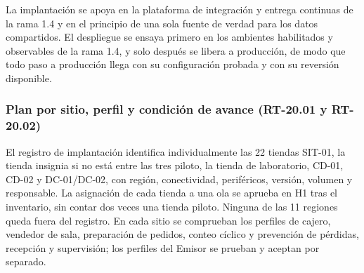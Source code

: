\documentclass[11pt]{article}
\begin{document}
La implantación se apoya en la plataforma de integración y entrega continuas de la rama 1.4 y en el principio de una sola fuente de verdad para los datos compartidos. El despliegue se ensaya primero en los ambientes habilitados y observables de la rama 1.4, y solo después se libera a producción, de modo que todo paso a producción llega con su configuración probada y con su reversión disponible.

\subsubsection*{Plan por sitio, perfil y condición de avance (RT-20.01 y RT-20.02)}

El registro de implantación identifica individualmente las 22 tiendas SIT-01, la tienda insignia si no está entre las tres piloto, la tienda de laboratorio, CD-01, CD-02 y DC-01/DC-02, con región, conectividad, periféricos, versión, volumen y responsable. La asignación de cada tienda a una ola se aprueba en H1 tras el inventario, sin contar dos veces una tienda piloto. Ninguna de las 11 regiones queda fuera del registro. En cada sitio se comprueban los perfiles de cajero, vendedor de sala, preparación de pedidos, conteo cíclico y prevención de pérdidas, recepción y supervisión; los perfiles del Emisor se prueban y aceptan por separado.
\end{document}
